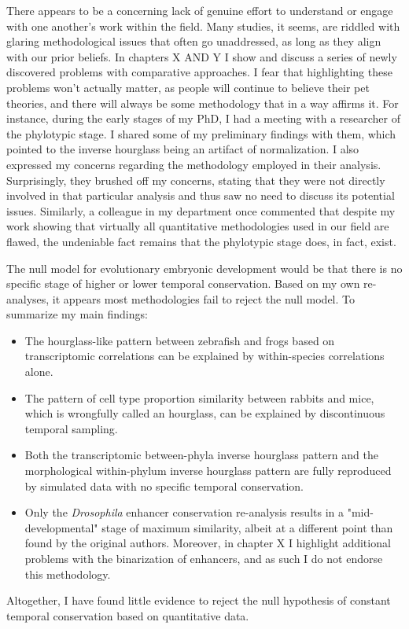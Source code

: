 There appears to be a concerning lack of genuine effort to understand or engage with one another's work within the field. Many studies, it seems, are riddled with glaring methodological issues that often go unaddressed, as long as they align with our prior beliefs. In chapters X AND Y I show and discuss a series of newly discovered problems with comparative approaches. I fear that highlighting these problems won't actually matter, as people will continue to believe their pet theories, and there will always be some methodology that in a way affirms it. For instance, during the early stages of my PhD, I had a meeting with a researcher of the phylotypic stage. I shared some of my preliminary findings with them, which pointed to the inverse hourglass being an artifact of normalization. I also expressed my concerns regarding the methodology employed in their analysis. Surprisingly, they brushed off my concerns, stating that they were not directly involved in that particular analysis and thus saw no need to discuss its potential issues. Similarly, a colleague in my department once commented that despite my work showing that virtually all quantitative methodologies used in our field are flawed, the undeniable fact remains that the phylotypic stage does, in fact, exist.

The null model for evolutionary embryonic development would be that there is no specific stage of higher or lower temporal conservation. Based on my own re-analyses, it appears most methodologies fail to reject the null model. To summarize my main findings:
\begin{itemize}
    \item The hourglass-like pattern between zebrafish and frogs based on transcriptomic correlations can be explained by within-species correlations alone.
    \item The pattern of cell type proportion similarity between rabbits and mice, which is wrongfully called an hourglass, can be explained by discontinuous temporal sampling.
    \item Both the transcriptomic between-phyla inverse hourglass pattern and the morphological within-phylum inverse hourglass pattern are fully reproduced by simulated data with no specific temporal conservation.
    \item Only the \textit{Drosophila} enhancer conservation re-analysis results in a "mid-developmental" stage of maximum similarity, albeit at a different point than found by the original authors. Moreover, in chapter X I highlight additional problems with the binarization of enhancers, and as such I do not endorse this methodology.
\end{itemize}
\noindent
Altogether, I have found little evidence to reject the null hypothesis of constant temporal conservation based on quantitative data.

